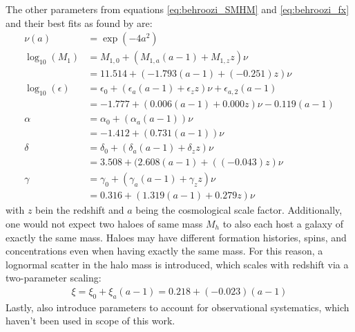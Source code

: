 The other parameters from equations \eqref{eq:behroozi_SMHM} and  \eqref{eq:behroozi_fx} and their best fits as found by \cite{Behroozi} are:
%
\begin{align}
    \nu(a) &= \exp(-4a^2) \\[0.5em]
    \log_{10}(M_1)  &= M_{1,0} + (M_{1,a}(a-1) + M_{1,z} z ) \nu \\\label{eq:SMHM_start}
    \nonumber &= 11.514 + (-1.793(a-1) + (-0.251)z) \nu \\[0.5em]
    \log_{10}(\epsilon) &= \epsilon_{0} + (\epsilon_{a}(a-1) + \epsilon_{z} z) \nu + \epsilon_{a,2}(a-1) \\
    \nonumber &= -1.777 + (0.006(a-1) + 0.000z)\nu - 0.119(a-1)\\[0.5em]						
    \alpha  &= \alpha_0 + (\alpha_a (a-1)) \nu \\
    \nonumber &= -1.412 + (0.731(a-1))\nu \\[0.5em]
    \delta  &= \delta_0 + (\delta_a (a-1) + \delta_z z) \nu \\
    \nonumber &= 3.508 + (2.608(a-1) + ((-0.043)z)\nu \\[0.5em]
    \gamma  &= \gamma_0 + (\gamma_a (a-1) + \gamma_z z) \nu \\
    \nonumber &= 0.316 + (1.319(a-1) + 0.279 z )\nu \label{eq:SMHM_end}
\end{align}
%
with $z$ bein the redshift and $a$ being the cosmological scale factor.
Additionally, one would not expect two haloes of same mass $M_h$ to also each host a galaxy of exactly the same mass.
Haloes may have different formation histories, spins, and concentrations even when having exactly the same mass.
For this reason, a lognormal scatter in the halo mass is introduced, which scales with redshift via a two-parameter scaling:
%
\begin{align}
    \xi = \xi_0 + \xi_a(a-1) = 0.218 + (-0.023)(a-1)
\end{align}
%
Lastly, \cite{Behroozi} also introduce parameters to account for observational systematics, which haven't been used in scope of this work.






